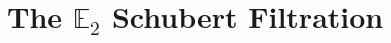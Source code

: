 \documentclass[reqno, oneside]{amsart}
\theoremstyle{definition}
\newtheorem{dfn}[nul]{Definition}
\theoremstyle{plain}
\begin{document}


\section{The $\mathbb{E}_2$ Schubert Filtration}


\begin{comment}
\section{Jeremy's revision}



\section{Allen's revision}

\begin{dfn}
The \textit{Ran space} $\text{Ran}(\mathbb{A}^1)$ is the presheaf that assigns to every $\mathbb{C}$-algebra $R$ the set of non-empty finite subsets of $\text{Spec}(R) \times \mathbb{A}^1$.   The Beilinson--Drinfeld Grassmannian is the presheaf $Gr_{G,Ran}$ that assigns to each $\mathbb{C}$-algebra $R$ the set of triplets $(x,\mathcal{E},\beta)$, where $x \in \text{Ran}(\mathbb{A}^1)(R)$, $\mathcal{E}$ is a $G$-torsor on $\mathbb{A}^1 \times \text{Spec}(R)$, and $\beta$ is a trivialization of $\mathcal{E}$ away from the graph of $x$ in $\text{Spec}(R) \times \mathbb{A}^1 $.
\end{dfn}



One thinks of the Beilinson--Drinfeld Grassmannian as fibered over the Ran space.  In other words, for every finite collection of points $I \subset \mathbb{A}^1$, there is a corresponding point $x$ in the Ran space.  The fiber of the Beilinson--Drinfeld Grassmannian over $x$ is the moduli of $G$-bundles on $\mathbb{A}^1$ equipped with a trivialization away from the points in $I$.  This fiber is naturally isomorphic to the product of $|I|$ copies of $Gr_G$.  The multiplication on $Gr_G$ is encoded by degeneration of fibers as points collide in $\mathbb{A}^1$.  For more details, see \cite[\S 3]{Zhu}.

The connection of the above structure with the notion of $\mathbb{E}_2$-algebra in homotopy theory was spelled out explicitly by Jacob Lurie in \cite[\S 5.5]{HA}.  Our next goal is to explain this connection; we refer the reader to \cite[\S 5.5]{HA} for the precise definitions.  


\end{comment}
\end{document}
